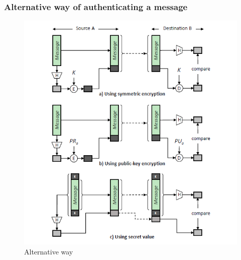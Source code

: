 \documentclass{article}
\begin{document}
                            \subsubsection{Alternative way of authenticating a message}
                                \begin{figure}[h]
                                    \begin{center}
                                    \includegraphics[scale=0.6]{../immagini/alternative.png}
                                    \end{center}
                                    \caption{Alternative way}
                                \end{figure}
\end{document}
